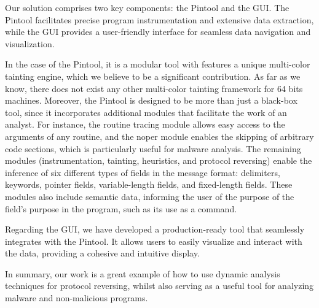 \documentclass[conference]{IEEEtran}
\begin{document}
Our solution comprises two key components: the Pintool and the GUI. The Pintool
facilitates precise program instrumentation and extensive data extraction,
while the GUI provides a user-friendly interface for seamless data navigation
and visualization.

In the case of the Pintool, it is a modular tool with features a unique
multi-color tainting engine, which we believe to be a significant contribution.
As far as we know, there does not exist any other multi-color tainting
framework for 64 bits machines. Moreover, the Pintool is designed to be more
than just a black-box tool, since it incorporates additional modules that
facilitate the work of an analyst. For instance, the routine tracing module
allows easy access to the arguments of any routine, and the noper module
enables the skipping of arbitrary code sections, which is particularly useful
for malware analysis. The remaining modules (instrumentation, tainting,
heuristics, and protocol reversing) enable the inference of six different types
of fields in the message format: delimiters, keywords, pointer fields,
variable-length fields, and fixed-length fields. These modules also include
semantic data, informing the user of the purpose of the field's purpose in the
program, such as its use as a command.

Regarding the GUI, we have developed a production-ready tool that seamlessly
integrates with the Pintool. It allows users to easily visualize and interact
with the data, providing a cohesive and intuitive display.

In summary, our work is a great example of how to use dynamic analysis
techniques for protocol reversing, whilst also serving as a useful tool for
analyzing malware and non-malicious programs.
\end{document}
